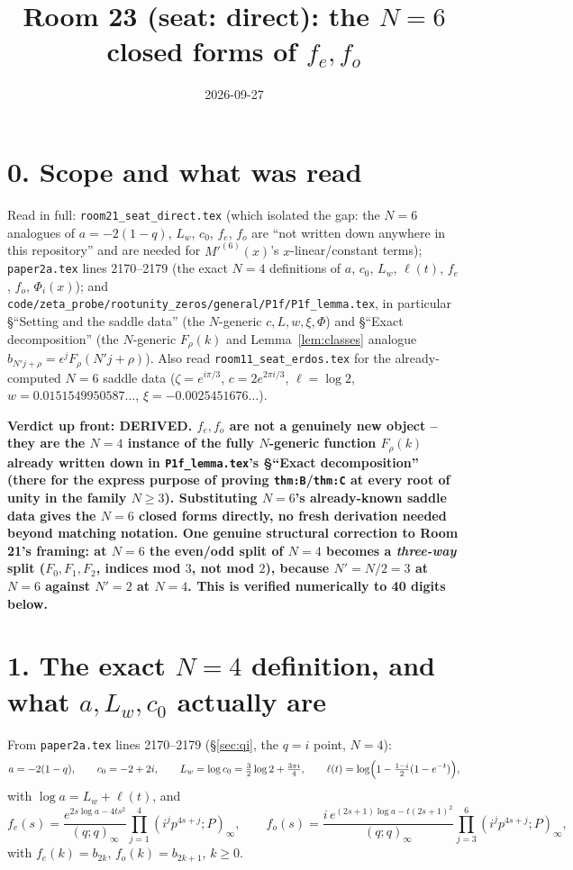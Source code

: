 \documentclass[11pt]{article}
\title{Room 23 (seat: direct): the $N=6$ closed forms of $f_e,f_o$}
\date{2026-09-27}
\begin{document}
\maketitle

\section*{0. Scope and what was read}

Read in full: \texttt{room21\_seat\_direct.tex} (which isolated the gap: the $N=6$ analogues of
$a=-2(1-q)$, $L_w$, $c_0$, $f_e$, $f_o$ are ``not written down anywhere in this repository'' and
are needed for $M'^{(6)}(x)$'s $x$-linear/constant terms); \texttt{paper2a.tex} lines 2170--2179
(the exact $N=4$ definitions of $a$, $c_0$, $L_w$, $\ell(t)$, $f_e$, $f_o$, $\Phi_i(x)$); and
\texttt{code/zeta\_probe/rootunity\_zeros/general/P1f/P1f\_lemma.tex}, in particular
\S``Setting and the saddle data'' (the $N$-generic $c,L,w,\xi,\Phi$) and \S``Exact decomposition''
(the $N$-generic $F_\rho(k)$ and Lemma~\ref{lem:classes} analogue $b_{N'j+\rho}=\epsilon^jF_\rho(N'j+\rho)$).
Also read \texttt{room11\_seat\_erdos.tex} for the already-computed $N=6$ saddle data
($\zeta=e^{i\pi/3}$, $c=2e^{2\pi i/3}$, $\ell=\log2$, $w=0.0151549950587\ldots$,
$\xi=-0.0025451676\ldots$).

\textbf{Verdict up front: DERIVED. $f_e,f_o$ are not a genuinely new object -- they are the
$N=4$ instance of the fully $N$-generic function $F_\rho(k)$ already written down in
\texttt{P1f\_lemma.tex}'s \S``Exact decomposition'' (there for the express purpose of proving
\texttt{thm:B}/\texttt{thm:C} at every root of unity in the family $N\ge3$). Substituting $N=6$'s
already-known saddle data gives the $N=6$ closed forms directly, no fresh derivation needed beyond
matching notation. One genuine structural correction to Room 21's framing: at $N=6$ the
even/odd split of $N=4$ becomes a \emph{three-way} split ($F_0,F_1,F_2$, indices mod $3$, not mod
$2$), because $N'=N/2=3$ at $N=6$ against $N'=2$ at $N=4$. This is verified numerically to 40
digits below.}

\section*{1. The exact $N=4$ definition, and what $a,L_w,c_0$ actually are}

From \texttt{paper2a.tex} lines 2170--2179 (\S\ref{sec:qi}, the $q=i$ point, $N=4$):
\[
  a=-2(1-q),\qquad c_0=-2+2i,\qquad L_w=\log c_0=\tfrac32\log2+\tfrac{3\pi i}4,\qquad
  \ell(t)=\log\Bigl(1-\tfrac{1-i}2(1-e^{-t})\Bigr),
\]
with $\log a=L_w+\ell(t)$, and
\[
  f_e(s)=\frac{e^{2s\log a-4ts^2}}{(q;q)_\infty}\prod_{j=1}^4(i^jp^{4s+j};P)_\infty,\qquad
  f_o(s)=\frac{i\,e^{(2s+1)\log a-t(2s+1)^2}}{(q;q)_\infty}\prod_{j=3}^6(i^jp^{4s+j};P)_\infty,
\]
with $f_e(k)=b_{2k}$, $f_o(k)=b_{2k+1}$, $k\ge0$.
\end{document}
